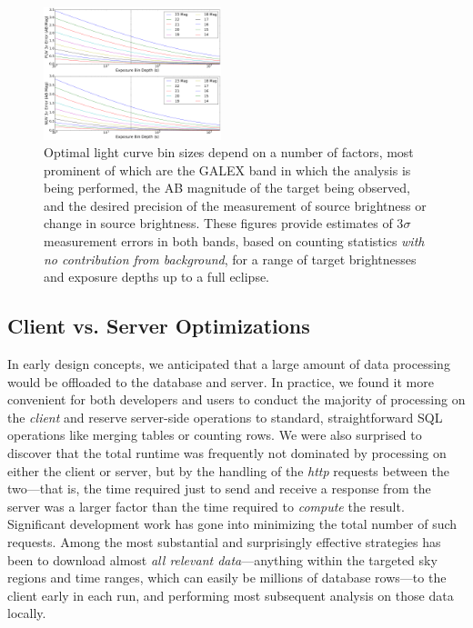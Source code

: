 \documentclass[trackchanges,preprint2]{aastex}
\begin{document}
\begin{figure}[h!]
\includegraphics[width=0.46\textwidth,keepaspectratio]{Fig11.pdf}
\caption{Optimal light curve bin sizes depend on a number of factors, most prominent of which are the GALEX band in which the analysis is being performed, the AB magnitude of the target being observed, and the desired precision of the measurement of source brightness or change in source brightness. These figures provide estimates of 3$\sigma$ measurement errors in both bands, based on counting statistics \emph{with no contribution from background}, for a range of target brightnesses and exposure depths up to a full eclipse.
\label{sigmadetlim}}
\end{figure}

\subsection{Client vs. Server Optimizations}
\label{speedopt}
In early design concepts, we anticipated that a large amount of data processing would be offloaded to the database and server. In practice, we found it more convenient for both developers and users to conduct the majority of processing on the \emph{client} and reserve server-side operations to standard, straightforward SQL operations like merging tables or counting rows. We were also surprised to discover that the total runtime was frequently not dominated by processing on either the client or server, but by the handling of the \emph{http} requests between the two---that is, the time required just to send and receive a response from the server was a larger factor than the time required to \emph{compute} the result. Significant development work has gone into minimizing the total number of such requests. Among the most substantial and surprisingly effective strategies has been to download almost \emph{all relevant data}---anything within the targeted sky regions and time ranges, which can easily be millions of database rows---to the client early in each run, and performing most subsequent analysis on those data locally.
\end{document}
